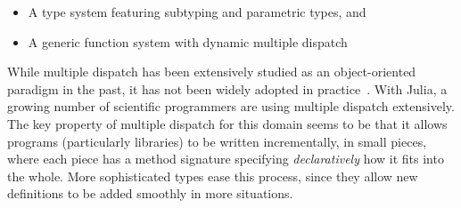 \begin{itemize}
  \item A type system featuring subtyping and parametric types, and
  \item A generic function system with dynamic multiple dispatch
\end{itemize}

%



While multiple dispatch has been extensively studied as an object-oriented
paradigm in the past, it has not been widely adopted in practice~\cite{Muschevici:2008}.
With Julia, a growing number of scientific programmers are using multiple dispatch
extensively. The key property of multiple
dispatch for this domain seems to be that it allows programs (particularly libraries)
to be written incrementally, in small pieces, where each piece has a method signature
specifying \emph{declaratively} how it fits into the whole.
More sophisticated types ease this process, since they allow new
definitions to be added smoothly in more situations.
